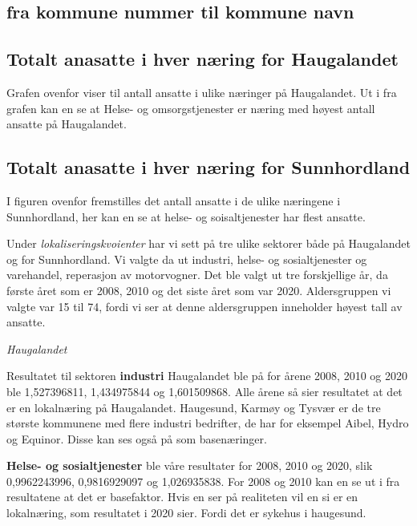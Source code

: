 \documentclass[
]{article}
\begin{document}
\hypertarget{fra-kommune-nummer-til-kommune-navn}{%
\subsection{fra kommune nummer til kommune
navn}\label{fra-kommune-nummer-til-kommune-navn}}

\hypertarget{totalt-anasatte-i-hver-nuxe6ring-for-haugalandet}{%
\subsection{Totalt anasatte i hver næring for
Haugalandet}\label{totalt-anasatte-i-hver-nuxe6ring-for-haugalandet}}

Grafen ovenfor viser til antall ansatte i ulike næringer på Haugalandet.
Ut i fra grafen kan en se at Helse- og omsorgstjenester er næring med
høyest antall ansatte på Haugalandet.

\hypertarget{totalt-anasatte-i-hver-nuxe6ring-for-sunnhordland}{%
\subsection{Totalt anasatte i hver næring for
Sunnhordland}\label{totalt-anasatte-i-hver-nuxe6ring-for-sunnhordland}}

I figuren ovenfor fremstilles det antall ansatte i de ulike næringene i
Sunnhordland, her kan en se at helse- og soisaltjenester har flest
ansatte.

Under \emph{lokaliseringskvoienter} har vi sett på tre ulike sektorer
både på Haugalandet og for Sunnhordland. Vi valgte da ut industri,
helse- og sosialtjenester og varehandel, reperasjon av motorvogner. Det
ble valgt ut tre forskjellige år, da første året som er 2008, 2010 og
det siste året som var 2020. Aldersgruppen vi valgte var 15 til 74,
fordi vi ser at denne aldersgruppen inneholder høyest tall av ansatte.

\emph{Haugalandet}

Resultatet til sektoren \textbf{industri} Haugalandet ble på for årene
2008, 2010 og 2020 ble 1,527396811, 1,434975844 og 1,601509868. Alle
årene så sier resultatet at det er en lokalnæring på Haugalandet.
Haugesund, Karmøy og Tysvær er de tre største kommunene med flere
industri bedrifter, de har for eksempel Aibel, Hydro og Equinor. Disse
kan ses også på som basenæringer.

\textbf{Helse- og sosialtjenester} ble våre resultater for 2008, 2010 og
2020, slik 0,9962243996, 0,9816929097 og 1,026935838. For 2008 og 2010
kan en se ut i fra resultatene at det er basefaktor. Hvis en ser på
realiteten vil en si er en lokalnæring, som resultatet i 2020 sier.
Fordi det er sykehus i haugesund.
\end{document}
